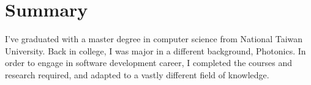 \section{Summary}
I've graduated with a master degree in computer science from National Taiwan University. Back in college, I was major in a different background, Photonics. In order to engage in software development career, I completed the courses and research required, and adapted to a vastly different field of knowledge.
